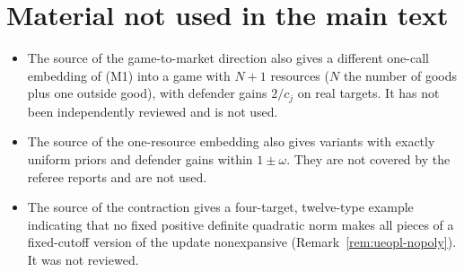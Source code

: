 \section{Material not used in the main text}

\begin{itemize}[nosep]
\item The source of the game-to-market direction also gives a different one-call embedding of (M1) into
a game with $N+1$ resources ($N$ the number of goods plus one outside good), with defender gains $2/c_j$
on real targets. It has not been independently reviewed and is not used.
\item The source of the one-resource embedding also gives variants with exactly uniform priors and
defender gains within $1\pm\omega$. They are not covered by the referee reports and are not used.
\item The source of the contraction gives a four-target, twelve-type example indicating that no fixed
positive definite quadratic norm makes all pieces of a fixed-cutoff version of the update nonexpansive
(Remark~\ref{rem:ueopl-nopoly}). It was not reviewed.
\end{itemize}
